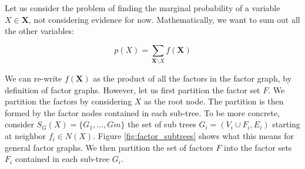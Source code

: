 \noindent
Let us consider the problem of finding the marginal probability
of a variable $X \in \textbf{X}$, not considering evidence for now.
Mathematically, we want to sum out all the other variables:

\begin{equation}\label{eq:factor_marg}
p(X) = \sum_{\textbf{X}\setminus X}f(\textbf{X})
\end{equation}

\noindent
We can re-write $f(\textbf{X})$ as the product of all the factors
in the factor graph, by definition of factor graphs. However, let
us first partition the factor set $F$. We partition the factors
by considering $X$ as the root node. The partition is then formed
by the factor nodes contained in each sub-tree.
To be more concrete, consider $S_G(X) = \{G_1, \dots, Gm\}$ the set
of sub trees $G_i = ( V_i \cup F_i, E_i)$ starting at neighbor 
$f_i \in N(X)$. Figure
\ref{fig:factor_subtrees} shows what this means for general factor graphs.
We then partition the set of factors $F$ into the factor sets $F_i$ 
contained in each sub-tree $G_i$. 

